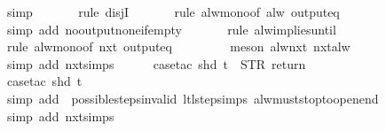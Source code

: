 \begin{isabellebody}
\ simp\isanewline
\ \ \ \ \ \isamarkupfalse%
\ {\isacharparenleft}rule\ disjI{}{\isacharparenright}\isanewline
\ \ \ \ \ \isamarkupfalse%
\ {\isacharparenleft}rule\ alw{\isacharunderscore}mono{\isacharbrackleft}of\ {\isachardoublequoteopen}alw\ {\isacharparenleft}output{\isacharunderscore}eq\ {\isacharbrackleft}{\isacharbrackright}{\isacharparenright}{\isachardoublequoteclose}{\isacharbrackright}{\isacharparenright}\isanewline
\ \ \ \ \isamarkupfalse%
\ {\isacharparenleft}simp\ add{\isacharcolon}\ no{\isacharunderscore}output{\isacharunderscore}none{\isacharunderscore}if{\isacharunderscore}empty{\isacharparenright}\isanewline
\ \ \ \ \ \isamarkupfalse%
\ {\isacharparenleft}rule\ alw{\isacharunderscore}implies{\isacharunderscore}until{\isacharparenright}\isanewline
\ \ \ \ \ \isamarkupfalse%
\ {\isacharparenleft}rule\ alw{\isacharunderscore}mono{\isacharbrackleft}of\ {\isachardoublequoteopen}nxt\ {\isacharparenleft}output{\isacharunderscore}eq\ {\isacharbrackleft}{\isacharbrackright}{\isacharparenright}{\isachardoublequoteclose}{\isacharbrackright}{\isacharparenright}\isanewline
\ \ \ \ \ \ \isamarkupfalse%
\ {\isacharparenleft}meson\ alw{\isacharunderscore}nxt\ nxt{\isacharunderscore}alw{\isacharparenright}\isanewline
\ \ \ \ \ \isamarkupfalse%
\ {\isacharparenleft}simp\ add{\isacharcolon}\ nxt{\isachardot}simps{\isacharparenright}\isanewline
\ \ \ \ \isamarkupfalse%
\ {\isacharparenleft}case{\isacharunderscore}tac\ {\isachardoublequoteopen}shd\ t\ {\isacharequal}\ {\isacharparenleft}STR\ {\isacharprime}{\isacharprime}return{\isacharprime}{\isacharprime}{\isacharcomma}\ {\isacharbrackleft}{\isacharbrackright}{\isacharparenright}{\isachardoublequoteclose}{\isacharparenright}\isanewline
\ \ \ \ \ \ \isamarkupfalse%
\ {}\isanewline
\ \ \ \ \ \ \isamarkupfalse%
\ {\isacharparenleft}case{\isacharunderscore}tac\ {\isachardoublequoteopen}shd\ t{\isachardoublequoteclose}{\isacharparenright}\isanewline
\ \ \ \ \ \ \isamarkupfalse%
\ {\isacharparenleft}simp\ add{\isacharcolon}\ \ possible{\isacharunderscore}steps{\isacharunderscore}{}{\isacharunderscore}invalid\ ltl{\isacharunderscore}step{\isachardot}simps\ alw{\isacharunderscore}must{\isacharunderscore}stop{\isacharunderscore}to{\isacharunderscore}open{\isacharunderscore}end{\isacharparenright}\isanewline
\ \ \ \ \ \isamarkupfalse%
\ {\isacharparenleft}simp\ add{\isacharcolon}\ nxt{\isachardot}simps{\isacharparenright}\isanewline

\end{isabellebody}
